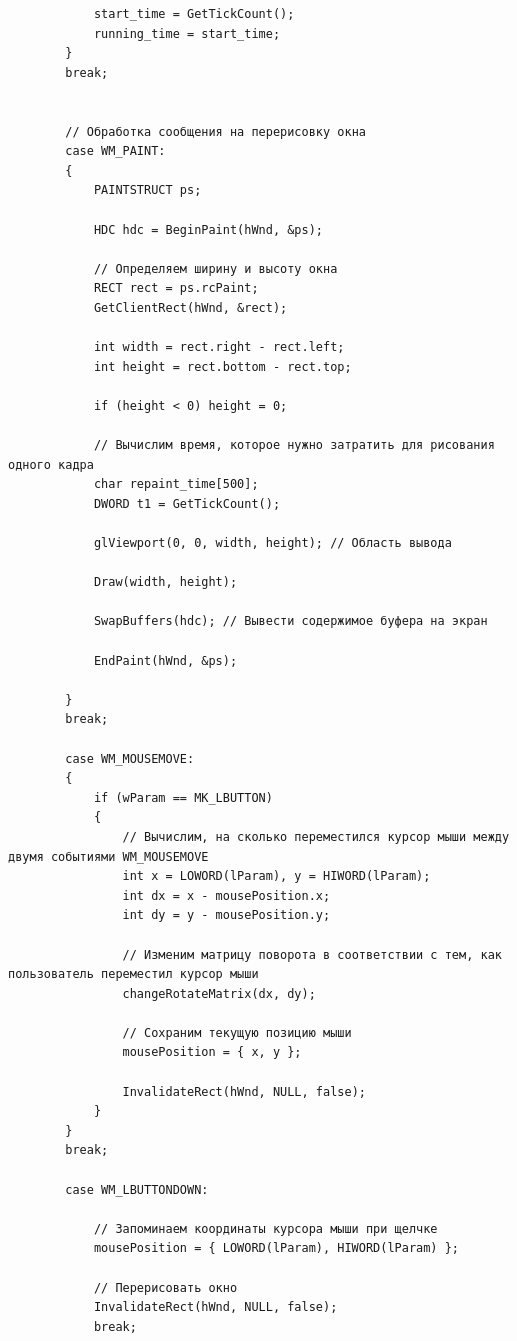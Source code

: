 \documentclass[a4paper,14pt]{extarticle}
\begin{document}
\begin{verbatim}
            start_time = GetTickCount();
            running_time = start_time;
        }
        break;


        // Обработка сообщения на перерисовку окна
        case WM_PAINT:
        {
            PAINTSTRUCT ps;
            
            HDC hdc = BeginPaint(hWnd, &ps);

            // Определяем ширину и высоту окна
            RECT rect = ps.rcPaint;
            GetClientRect(hWnd, &rect);
         
            int width = rect.right - rect.left;
            int height = rect.bottom - rect.top;

            if (height < 0) height = 0;
                      
            // Вычислим время, которое нужно затратить для рисования одного кадра
            char repaint_time[500];
            DWORD t1 = GetTickCount();
            
            glViewport(0, 0, width, height); // Область вывода

            Draw(width, height);
            
            SwapBuffers(hdc); // Вывести содержимое буфера на экран
            
            EndPaint(hWnd, &ps);

        }
        break;

        case WM_MOUSEMOVE:
        {
            if (wParam == MK_LBUTTON)
            {
                // Вычислим, на сколько переместился курсор мыши между двумя событиями WM_MOUSEMOVE
                int x = LOWORD(lParam), y = HIWORD(lParam);
                int dx = x - mousePosition.x;
                int dy = y - mousePosition.y;

                // Изменим матрицу поворота в соответствии с тем, как пользователь переместил курсор мыши
                changeRotateMatrix(dx, dy);

                // Сохраним текущую позицию мыши
                mousePosition = { x, y };

                InvalidateRect(hWnd, NULL, false);
            }
        }
        break;

        case WM_LBUTTONDOWN:
            
            // Запоминаем координаты курсора мыши при щелчке
            mousePosition = { LOWORD(lParam), HIWORD(lParam) };
            
            // Перерисовать окно
            InvalidateRect(hWnd, NULL, false);
            break;


\end{verbatim}
\end{document}

